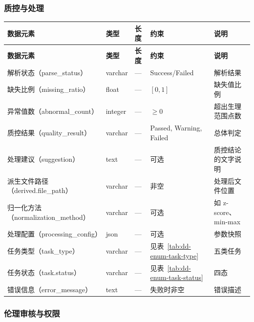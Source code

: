 \subsubsection{质控与处理}

{\small
\begin{longtable}{|p{32mm}|p{20mm}|p{16mm}|p{24mm}|p{42mm}|}
\hline
\textbf{数据元素} & \textbf{类型} & \textbf{长度} & \textbf{约束} & \textbf{说明}\\\hline
\endfirsthead
\hline
\textbf{数据元素} & \textbf{类型} & \textbf{长度} & \textbf{约束} & \textbf{说明}\\\hline
\endhead
解析状态（parse\_status）& varchar & --- & Success/Failed & 解析结果 \\ \hline
缺失比例（missing\_ratio）& float & --- & $[0,1]$ & 缺失值比例 \\ \hline
异常值数（abnormal\_count）& integer & --- & $\ge$0 & 超出生理范围点数 \\ \hline
质控结果（quality\_result）& varchar & --- & Passed, Warning, Failed & 总体判定 \\ \hline
处理建议（suggestion）& text & --- & 可选 & 质控结论的文字说明 \\ \hline
派生文件路径（derived.file\_path）& varchar & --- & 非空 & 处理后文件位置 \\ \hline
归一化方法（normalization\_method）& varchar & --- & 可选 & 如 z-score、min-max \\ \hline
处理配置（processing\_config）& json & --- & 可选 & 参数快照 \\ \hline
任务类型（task\_type）& varchar & --- & 见表~\ref{tab:dd-enum-task-type} & 五类任务 \\ \hline
任务状态（task.status）& varchar & --- & 见表~\ref{tab:dd-enum-task-status} & 四态 \\ \hline
错误信息（error\_message）& text & --- & 失败时非空 & 错误描述 \\ \hline
\end{longtable}
}

\subsubsection{伦理审核与权限}

